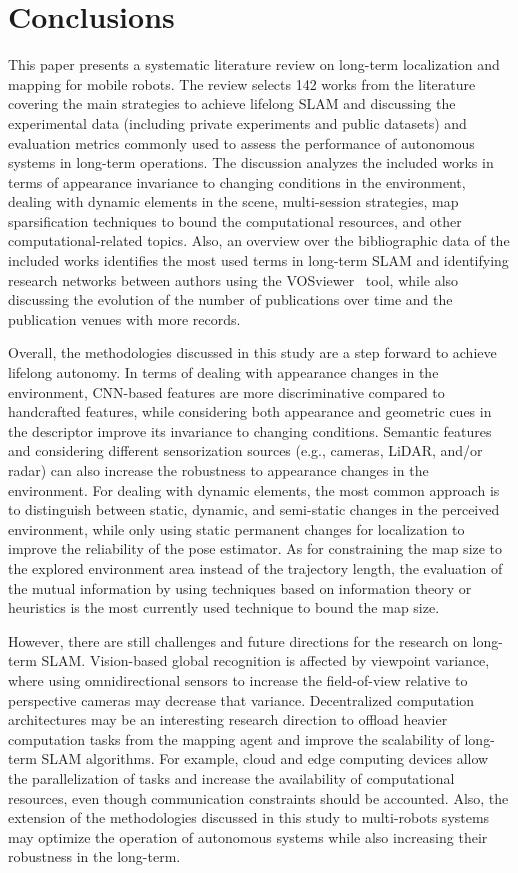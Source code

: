 \section{Conclusions}
\label{sec:conclusions}

This paper presents a systematic literature review on long-term localization and mapping for mobile robots. The review selects 142 works from the literature covering the main strategies to achieve lifelong SLAM and discussing the experimental data (including private experiments and public datasets) and evaluation metrics commonly used to assess the performance of autonomous systems in long-term operations.
The discussion analyzes the included works in terms of appearance invariance to changing conditions in the environment, dealing with dynamic elements in the scene, multi-session strategies, map sparsification techniques to bound the computational resources, and other computational-related topics.
Also, an overview over the bibliographic data of the included works identifies the most used terms in long-term SLAM and identifying research networks between authors using the VOSviewer~\parencite{results:vosviewer:1,results:vosviewer:2} tool, while also discussing the evolution of the number of publications over time and the publication venues with more records.

Overall, the methodologies discussed in this study are a step forward to achieve lifelong autonomy.
In terms of dealing with appearance changes in the environment, CNN-based features are more discriminative compared to handcrafted features, while considering both appearance and geometric cues in the descriptor improve its invariance to changing conditions. Semantic features and considering different sensorization sources (e.g., cameras, LiDAR, and/or radar) can also increase the robustness to appearance changes in the environment.
For dealing with dynamic elements, the most common approach is to distinguish between static, dynamic, and semi-static changes in the perceived environment, while only using static permanent changes for localization to improve the reliability of the pose estimator.
As for constraining the map size to the explored environment area instead of the trajectory length, the evaluation of the mutual information by using techniques based on information theory or heuristics is the most currently used technique to bound the map size.

However, there are still challenges and future directions for the research on long-term SLAM. Vision-based global recognition is affected by viewpoint variance, where using omnidirectional sensors to increase the field-of-view relative to perspective cameras may decrease that variance. Decentralized computation architectures may be an interesting research direction to offload heavier computation tasks from the mapping agent and improve the scalability of long-term SLAM algorithms. For example, cloud and edge computing devices allow the parallelization of tasks and increase the availability of computational resources, even though communication constraints should be accounted. Also, the extension of the methodologies discussed in this study to multi-robots systems may optimize the operation of autonomous systems while also increasing their robustness in the long-term.

